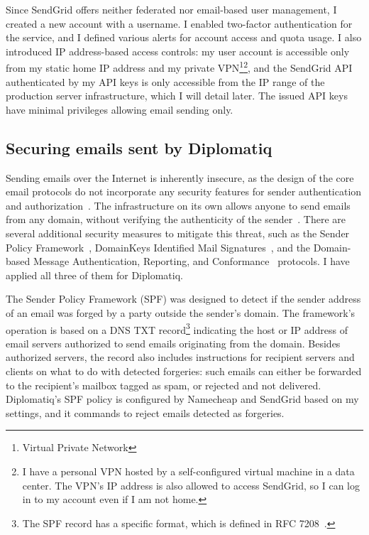 Since SendGrid offers neither federated nor email-based user management, I created a new account with a username. I enabled two-factor authentication for the service, and I defined various alerts for account access and quota usage. I also introduced IP address-based access controls: my user account is accessible only from my static home IP address and my private VPN\footnote{Virtual Private Network}\footnote{I have a personal VPN hosted by a self-configured virtual machine in a data center. The VPN's IP address is also allowed to access SendGrid, so I can log in to my account even if I am not home.}, and the SendGrid API authenticated by my API keys is only accessible from the IP range of the production server infrastructure, which I will detail later. The issued API keys have minimal privileges allowing email sending only.

\subsection{Securing emails sent by Diplomatiq}

Sending emails over the Internet is inherently insecure, as the design of the core email protocols do not incorporate any security features for sender authentication and authorization~\cite{foster2015security}. The infrastructure on its own allows anyone to send emails from any domain, without verifying the authenticity of the sender~\cite{rfc5321}. There are several additional security measures to mitigate this threat, such as the Sender Policy Framework~\cite{rfc7208}, DomainKeys Identified Mail Signatures~\cite{rfc6376}, and the Domain-based Message Authentication, Reporting, and Conformance~\cite{rfc7489} protocols. I have applied all three of them for Diplomatiq.

The Sender Policy Framework (SPF) was designed to detect if the sender address of an email was forged by a party outside the sender's domain. The framework's operation is based on a DNS TXT record\footnote{The SPF record has a specific format, which is defined in RFC 7208~\cite{rfc7208}.} indicating the host or IP address of email servers authorized to send emails originating from the domain. Besides authorized servers, the record also includes instructions for recipient servers and clients on what to do with detected forgeries: such emails can either be forwarded to the recipient's mailbox tagged as spam, or rejected and not delivered. Diplomatiq's SPF policy is configured by Namecheap and SendGrid based on my settings, and it commands to reject emails detected as forgeries.

